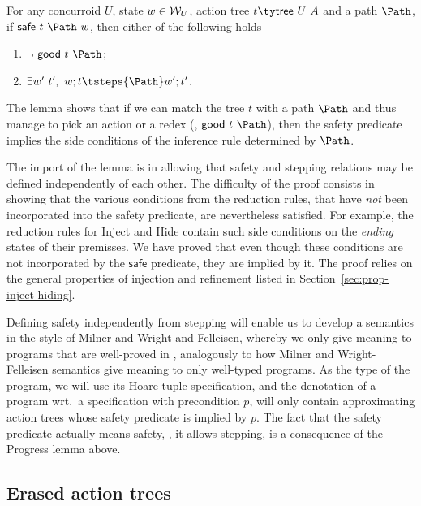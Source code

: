 \begin{lemma}
\label{thm:progress}
For any concurroid $U$, state $w \in {\cal W}_U$, action tree $t \ty
\mathsf{tree}~U~A$ and a path $\Path$, if $\mathsf{safe}~t~\Path~w$,
then either of the following holds
%
\begin{enumerate}
\item $\neg~ \mathsf{good}~t~\Path$;
\item $\exists w'~t',~ w;t \tsteps{\Path} w';t'$.
\end{enumerate}
\end{lemma}

The lemma shows that if we can match the tree $t$ with a path $\Path$
and thus manage to pick an action or a redex (\ie,
$\mathsf{good}~t~\Path$), then the safety predicate implies the side
conditions of the inference rule determined by $\Path$.

The import of the lemma is in allowing that safety and stepping
relations may be defined independently of each other. The difficulty
of the proof consists in showing that the various conditions from the
reduction rules, that have \emph{not} been incorporated into the
safety predicate, are nevertheless satisfied. For example, the
reduction rules for \textsf{Inject} and \textsf{Hide} contain such
side conditions on the \emph{ending} states of their premisses. We
have proved that even though these conditions are not incorporated by
the $\mathsf{safe}$ predicate, they are implied by it. The proof
relies on the general properties of injection and refinement listed in
Section~\ref{sec:prop-inject-hiding}.

Defining safety independently from stepping will enable us to develop
a semantics in the style of Milner and Wright and Felleisen, whereby
we only give meaning to programs that are well-proved in \SCST,
analogously to how Milner and Wright-Felleisen semantics give meaning
to only well-typed programs. As the type of the program, we will use
its Hoare-tuple specification, and the denotation of a program wrt.~a
specification with precondition $p$, will only contain approximating
action trees whose safety predicate is implied by $p$. The fact that
the safety predicate actually means safety, \ie, it allows stepping,
is a consequence of the Progress lemma above.

\subsection{Erased \SCST action trees}
\label{sec:ersem}

